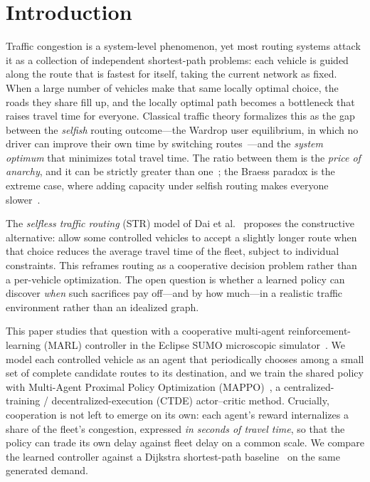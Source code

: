 \section{Introduction}
Traffic congestion is a system-level phenomenon, yet most routing systems attack it as
a collection of independent shortest-path problems: each vehicle is guided along the
route that is fastest for itself, taking the current network as fixed. When a large
number of vehicles make that same locally optimal choice, the roads they share fill up,
and the locally optimal path becomes a bottleneck that raises travel time for everyone.
Classical traffic theory formalizes this as the gap between the \emph{selfish} routing
outcome---the Wardrop user equilibrium, in which no driver can improve their own time by
switching routes~\cite{wardrop1952}---and the \emph{system optimum} that minimizes total
travel time. The ratio between them is the \emph{price of anarchy}, and it can be
strictly greater than one~\cite{roughgarden2002selfish}; the Braess paradox is the
extreme case, where adding capacity under selfish routing makes everyone slower~\cite{braess2005paradox}.

The \emph{selfless traffic routing} (STR) model of Dai et al.~\cite{dai2019str} proposes
the constructive alternative: allow some controlled vehicles to accept a slightly longer
route when that choice reduces the average travel time of the fleet, subject to
individual constraints. This reframes routing as a cooperative decision problem rather
than a per-vehicle optimization. The open question is whether a learned policy can
discover \emph{when} such sacrifices pay off---and by how much---in a realistic traffic
environment rather than an idealized graph.

This paper studies that question with a cooperative multi-agent reinforcement-learning
(MARL) controller in the Eclipse SUMO microscopic simulator~\cite{lopez2018sumo}. We model
each controlled vehicle as an agent that periodically chooses among a small set of complete
candidate routes to its destination, and we train the shared policy with Multi-Agent
Proximal Policy Optimization (MAPPO)~\cite{yu2022mappo}, a centralized-training /
decentralized-execution (CTDE) actor--critic method. Crucially, cooperation is not left to
emerge on its own: each agent's reward internalizes a share of the fleet's congestion,
expressed \emph{in seconds of travel time}, so that the policy can trade its own delay
against fleet delay on a common scale. We compare the learned controller against a Dijkstra
shortest-path baseline~\cite{dijkstra1959note} on the same generated demand.

